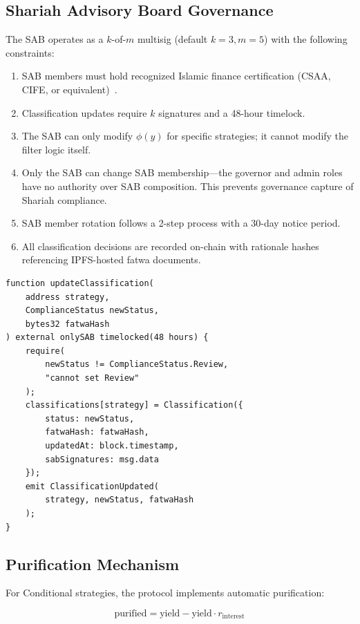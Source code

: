 \subsection{Shariah Advisory Board Governance}

The SAB operates as a $k$-of-$m$ multisig (default $k=3, m=5$) with the following constraints:

\begin{enumerate}[nosep]
  \item SAB members must hold recognized Islamic finance certification (CSAA, CIFE, or equivalent)~\cite{aaoifi2015}.
  \item Classification updates require $k$ signatures and a 48-hour timelock.
  \item The SAB can only modify $\phi(y)$ for specific strategies; it cannot modify the filter logic itself.
  \item Only the SAB can change SAB membership---the governor and admin roles have no authority over SAB composition. This prevents governance capture of Shariah compliance.
  \item SAB member rotation follows a 2-step process with a 30-day notice period.
  \item All classification decisions are recorded on-chain with rationale hashes referencing IPFS-hosted fatwa documents.
\end{enumerate}

\begin{lstlisting}[language=Solidity,caption=ShariaFilter classification update]
function updateClassification(
    address strategy,
    ComplianceStatus newStatus,
    bytes32 fatwaHash
) external onlySAB timelocked(48 hours) {
    require(
        newStatus != ComplianceStatus.Review,
        "cannot set Review"
    );
    classifications[strategy] = Classification({
        status: newStatus,
        fatwaHash: fatwaHash,
        updatedAt: block.timestamp,
        sabSignatures: msg.data
    });
    emit ClassificationUpdated(
        strategy, newStatus, fatwaHash
    );
}
\end{lstlisting}

\subsection{Purification Mechanism}

For Conditional strategies, the protocol implements automatic purification:

\begin{equation}
  \text{purified} = \text{yield} - \text{yield} \cdot r_{\text{interest}}
\end{equation}

